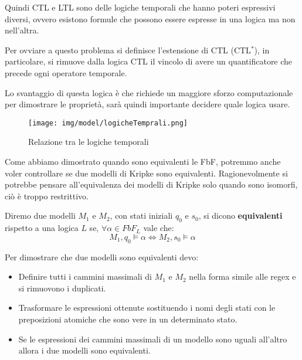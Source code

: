 Quindi CTL e LTL sono delle logiche temporali che hanno poteri espressivi diversi,
ovvero esistono formule che possono essere espresse in una logica ma non nell'altra.

Per ovviare a questo problema si definisce l'estensione di CTL (CTL$^\ast$),
in particolare, si rimuove dalla logica CTL il vincolo di avere un quantificatore
che precede ogni operatore temporale.

Lo svantaggio di questa logica è che richiede un maggiore sforzo computazionale
per dimostrare le proprietà, sarà quindi importante decidere quale logica usare.
\begin{figure}[!ht]
    \centering
    \texttt{[image: img/model/logicheTemprali.png]}
    \caption{Relazione tra le logiche temporali}
\end{figure}
Come abbiamo dimostrato quando sono equivalenti le FbF, potremmo anche voler
controllare se due modelli di Kripke sono equivalenti. Ragionevolmente si potrebbe
pensare all'equivalenza dei modelli di Kripke solo quando sono isomorfi, ciò
è troppo restrittivo.
\begin{definizione}
    Diremo due modelli $M_1$ e $M_2$, con stati iniziali $q_0$ e $s_0$, si dicono
    \textbf{equivalenti} rispetto a una logica $L$ se, $\forall \alpha \in FbF_L$
    vale che:
    \begin{equation}
        M_1, q_0 \models \alpha \iff M_2, s_0 \models \alpha
    \end{equation}
\end{definizione}
Per dimostrare che due modelli sono equivalenti devo:
\begin{itemize}
    \item Definire tutti i cammini massimali di $M_1$ e $M_2$ nella forma simile
          alle regex e si rimuovono i duplicati.
    \item Trasformare le espressioni ottenute sostituendo i nomi degli stati con
          le preposizioni atomiche che sono vere in un determinato stato.
    \item Se le espressioni dei cammini massimali di un modello sono uguali
          all'altro allora i due modelli sono equivalenti.
\end{itemize}
